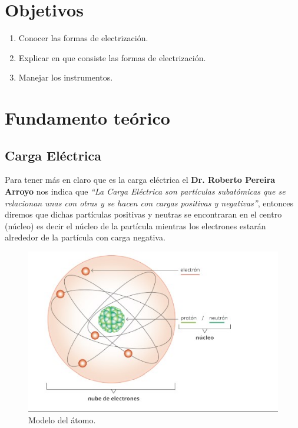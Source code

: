 \begin{center}
	\underline{\Large\scshape\bfseries \dytema}
\end{center}
\section{Objetivos}
\begin{enumerate}[label=\itemcirccz{azzul}{\arabic*},itemsep=2pt,partopsep=6pt]
	\item Conocer las formas de electrización.
	\item Explicar en que consiste las formas de electrización.
	\item Manejar los instrumentos.
\end{enumerate}

\section{Fundamento teórico}
\subsection{Carga Eléctrica}
Para tener más en claro que es la carga eléctrica el \textbf{Dr\@. Roberto
	Pereira Arroyo} nos indica que \emph{``La Carga Eléctrica son partículas
	subatómicas que se relacionan unas con otras y se hacen con cargas positivas y
	negativas''}, entonces diremos que dichas partículas positivas y neutras se
encontraran en el centro (núcleo) es decir el núcleo de la partícula mientras
los electrones estarán alrededor de la partícula con carga negativa.
\begin{figure}[H]
	\centering
	\includegraphics[width=12.5cm]{Images/img1.jpg}
	\caption{Modelo del átomo.}\label{Fig:fg1}
\end{figure}

